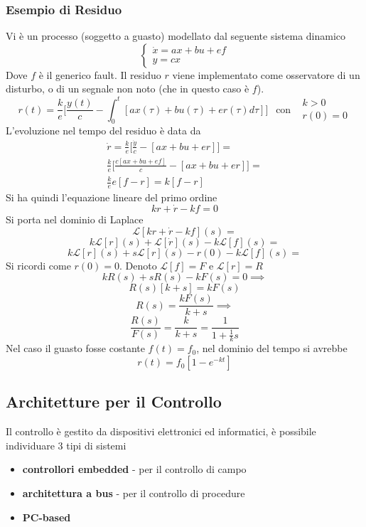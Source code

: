 \documentclass[10pt, letterpaper]{report}
\begin{document}
\subsubsection{Esempio di Residuo}
Vi è un processo (soggetto a guasto) modellato dal seguente sistema dinamico$$\begin{cases}
    \dot{x}=ax+bu+ef\\y=cx
\end{cases} $$
Dove $f$ è il generico fault. Il residuo $r$ viene implementato come osservatore di un disturbo, o di un 
segnale non noto (che in questo caso è $f$). 
$$ r(t)=\frac{k}{e}\Big[
\frac{y(t)}{c}-\int_0^t[ax(\tau)+bu(\tau)+er(\tau)d\tau]\Big] \ \  \text{ con }\ \ \begin{matrix}
    k>0\\ r(0)=0
\end{matrix}    
$$
L'evoluzione nel tempo del residuo è data da 
\begin{eqnarray}
    \dot{r}=\frac{k}{e}\Big[ \frac{\dot{y}}{c}-[ax+bu+er] \Big] = \\
    \frac{k}{e}\Big[ \frac{c[ax+bu+ef]}{c}-[ax+bu+er] \Big] = \\
    \frac{k}{e}e[f-r] = k[f-r]
\end{eqnarray}
Si ha quindi l'equazione lineare del primo ordine 
$$ kr+\dot{r}-kf=0$$
Si porta nel dominio di Laplace 
$$\mathcal{L}[kr+\dot{r}-kf](s)= $$ $$ 
k\mathcal{L}[r](s)+
\mathcal{L}[\dot{r}](s)-
k\mathcal{L}[f](s) = 
$$$$ 
k\mathcal{L}[r](s)+
s\mathcal{L}[r](s)-r(0)-
k\mathcal{L}[f](s) = 
$$
Si ricordi come $r(0)=0$. Denoto $\mathcal{L}[f]=F$ e $\mathcal{L}[r]=R$
$$ 
kR(s)+sR(s)-kF(s)=0\implies 
$$ $$ 
R(s)[k+s]=kF(s)
$$ 
$$
R(s)=\frac{kF(s)}{k+s} \implies 
$$ 
$$ \frac{R(s)}{F(s)}=\frac{k}{k+s}=\frac{1}{1+\frac{1}{k}s} $$
Nel caso il guasto fosse costante $f(t)=f_0$, nel dominio del tempo si avrebbe 
$$ r(t)=f_0[1-e^{-kt}]$$
\subsection{Architetture per il Controllo}
Il controllo è gestito da dispositivi elettronici ed informatici, è possibile individuare 3 tipi di 
sistemi\begin{itemize}
    \item \textbf{controllori embedded} - per il controllo di campo 
    \item \textbf{architettura a bus} - per il controllo di procedure 
    \item \textbf{PC-based}
\end{itemize}
\end{document}
